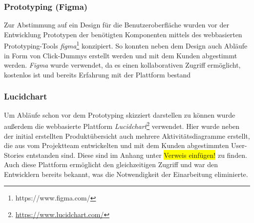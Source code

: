 \documentclass[10pt, a4paper]{article}
\begin{document}
\subsubsection{Prototyping (Figma)}
\label{figma}
Zur Abstimmung auf ein Design für die Benutzeroberfläche wurden vor der Entwicklung Prototypen der benötigten Komponenten mittels des webbasierten
Prototyping-Tools \textit{figma}\footnote{https://www.figma.com/} konzipiert. So konnten neben dem Design auch Abläufe in Form von \glqq Click-Dummys\grqq{} erstellt werden und mit dem Kunden abgestimmt werden.
\textit{Figma} wurde verwendet, da es einen kollaborativen Zugriff ermöglicht, kostenlos ist und bereits Erfahrung mit der Plattform bestand

\subsubsection{Lucidchart}
\label{Lucidchart}
Um Abläufe schon vor dem Prototyping skizziert darstellen zu können wurde außerdem die webbasierte Plattform \textit{Lucidchart}\footnote{\raggedright\url{https://www.lucidchart.com/}} verwendet.
Hier wurde neben der initial erstellten Produktübersicht auch mehrere Aktivitätsdiagramme erstellt, die aus vom Projektteam entwickelten und mit dem Kunden abgestimmten User-Stories entstanden sind.
Diese sind im Anhang unter \colorbox{yellow}{Verweis einfügen!} zu finden.
Auch diese Plattform ermöglicht den gleichzeitigen Zugriff und war den Entwicklern bereits bekannt, was die Notwendigkeit der Einarbeitung eliminierte.
\end{document}
